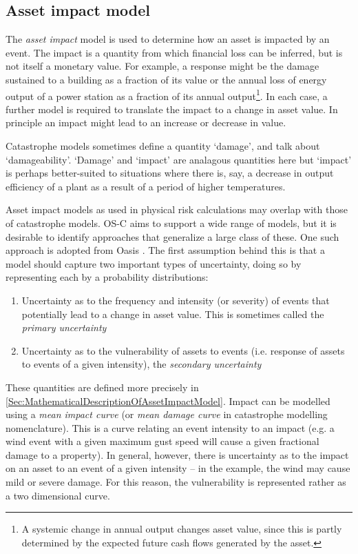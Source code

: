 \documentclass[a4paper,11pt]{extarticle} %
\begin{document}
\subsection{Asset impact model}
\label{SubSec:AcuteAssetImpactModel}
The {\it asset impact} model is used to determine how an asset is impacted by an event. The impact is a quantity from which financial loss can be inferred, but is not itself a monetary value. For example, a response might be the damage sustained to a building as a fraction of its value or the annual loss of energy output of a power station as a fraction of its annual output\footnote{A systemic change in annual output changes asset value, since this is partly determined by the expected future cash flows generated by the asset.}. In each case, a further model is required to translate the impact to a change in asset value. In principle an impact might lead to an increase or decrease in value.

Catastrophe models sometimes define a quantity `damage', and talk about `damageability'. `Damage' and `impact' are analagous quantities here but `impact' is perhaps better-suited to situations where there is, say, a decrease in output efficiency of a plant as a result of a period of higher temperatures.

Asset impact models as used in physical risk calculations may overlap with those of catastrophe models. OS-C aims to support a wide range of models, but it is desirable to identify approaches that generalize a large class of these. One such approach is adopted from Oasis \cite{OasisLMF}. The first assumption behind this is that a model should capture two important types of uncertainty, doing so by representing each by a probability distributions:
\begin{enumerate}
    \item Uncertainty as to the frequency and intensity (or severity) of events that potentially lead to a change in asset value. This is sometimes called the {\it primary uncertainty}
    \item Uncertainty as to the vulnerability of assets to events (i.e. response of assets to events of a given intensity), the {\it secondary uncertainty}
\end{enumerate}

These quantities are defined more precisely in \ref{Sec:MathematicalDescriptionOfAssetImpactModel}. Impact can be modelled using a {\it mean impact curve} (or {\it mean damage curve} in catastrophe modelling nomenclature). This is a curve relating an event intensity to an impact (e.g. a wind event with a given maximum gust speed will cause a given fractional damage to a property). In general, however, there is uncertainty as to the impact on an asset to an event of a given intensity -- in the example, the wind may cause mild or severe damage. For this reason, the vulnerability is represented rather as a two dimensional curve.
\end{document}
